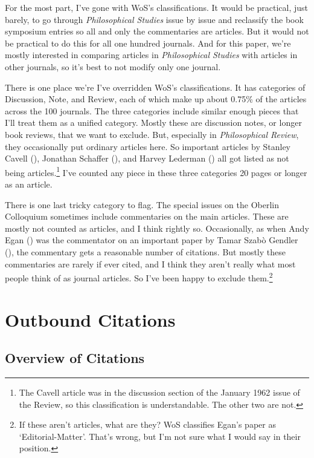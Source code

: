 \documentclass[
  10pt,
  letterpaper,
  DIV=11,
  numbers=noendperiod,
  twoside]{scrartcl}
\begin{document}
For the most part, I've gone with WoS's classifications. It would be
practical, just barely, to go through \emph{Philosophical Studies} issue
by issue and reclassify the book symposium entries so all and only the
commentaries are articles. But it would not be practical to do this for
all one hundred journals. And for this paper, we're mostly interested in
comparing articles in \emph{Philosophical Studies} with articles in
other journals, so it's best to not modify only one journal.

There is one place we're I've overridden WoS's classifications. It has
categories of Discussion, Note, and Review, each of which make up about
0.75\% of the articles across the 100 journals. The three categories
include similar enough pieces that I'll treat them as a unified
category. Mostly these are discussion notes, or longer book reviews,
that we want to exclude. But, especially in \emph{Philosophical Review},
they occasionally put ordinary articles here. So important articles by
Stanley Cavell (), Jonathan
Schaffer (), and Harvey Lederman
() all got listed as not being
articles.\footnote{The Cavell article was in the discussion section of
  the January 1962 issue of the Review, so this classification is
  understandable. The other two are not.} I've counted any piece in
these three categories 20 pages or longer as an article.

There is one last tricky category to flag. The special issues on the
Oberlin Colloquium sometimes include commentaries on the main articles.
These are mostly not counted as articles, and I think rightly so.
Occasionally, as when Andy Egan () was the
commentator on an important paper by Tamar Szabò Gendler
(), the commentary gets a
reasonable number of citations. But mostly these commentaries are rarely
if ever cited, and I think they aren't really what most people think of
as journal articles. So I've been happy to exclude them.\footnote{If
  these aren't articles, what are they? WoS classifies Egan's paper as
  `Editorial-Matter'. That's wrong, but I'm not sure what I would say in
  their position.}

\section{Outbound Citations}\label{sec-outbound}

\subsection{Overview of Citations}\label{sec-citations-overview}
\end{document}
